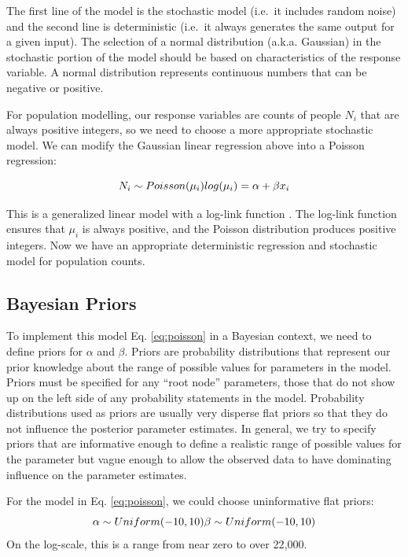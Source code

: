 \documentclass[]{book}
\begin{document}
The first line of the model is the stochastic model (i.e.~it includes
random noise) and the second line is deterministic (i.e.~it always
generates the same output for a given input). The selection of a normal
distribution (a.k.a. Gaussian) in the stochastic portion of the model
should be based on characteristics of the response variable. A normal
distribution represents continuous numbers that can be negative or
positive.

For population modelling, our response variables are counts of people
\(N_i\) that are always positive integers, so we need to choose a more
appropriate stochastic model. We can modify the Gaussian linear
regression above into a Poisson regression:

\begin{equation}
  N_i \sim Poisson( \mu_i ) \\
  log(\mu_i) = \alpha + \beta x_i
  \label{eq:poisson}
\end{equation}

This is a generalized linear model with a log-link function
\citep{mccullagh1989generalized}. The log-link function ensures that
\(\mu_i\) is always positive, and the Poisson distribution produces
positive integers. Now we have an appropriate deterministic regression
and stochastic model for population counts.

\subsection{Bayesian Priors}\label{bayesian-priors}

To implement this model Eq. \eqref{eq:poisson} in a Bayesian context, we
need to define priors for \(\alpha\) and \(\beta\). Priors are
probability distributions that represent our prior knowledge about the
range of possible values for parameters in the model. Priors must be
specified for any ``root node'' parameters, those that do not show up on
the left side of any probability statements in the model. Probability
distributions used as priors are usually very disperse flat priors so
that they do not influence the posterior parameter estimates. In
general, we try to specify priors that are informative enough to define
a realistic range of possible values for the parameter but vague enough
to allow the observed data to have dominating influence on the parameter
estimates.

For the model in Eq. \eqref{eq:poisson}, we could choose uninformative
flat priors: \[
\alpha \sim Uniform(-10, 10) \\
\beta \sim Uniform(-10, 10) 
\] On the log-scale, this is a range from near zero to over 22,000.
\end{document}
